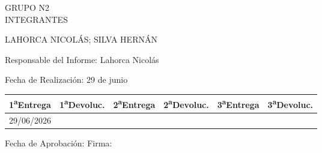 \begin{titlepage}
\begin{minipage}{\textwidth}
    \vspace{4mm}
    GRUPO N\textdegree{}2\\
    INTEGRANTES

    \vspace{2mm}
    LAHORCA NICOLÁS; SILVA HERNÁN

    \vspace{4mm}
    Responsable del Informe: Lahorca Nicolás

    \vspace{4mm}
    Fecha de Realización: 29 de junio

    \vspace{4mm}
    \begin{tabularx}{\textwidth}{|X|X|X|X|X|X|}
        \hline
        1\textsuperscript{a}Entrega  & 
        1\textsuperscript{a}Devoluc. &
        2\textsuperscript{a}Entrega  &
        2\textsuperscript{a}Devoluc. &
        3\textsuperscript{a}Entrega  &
        3\textsuperscript{a}Devoluc. \\
        \hline
        \rule{0pt}{1cm} 29/06/2026 & & & & &  \\
        \hline
    \end{tabularx}

    \vspace{1cm}
    Fecha de Aprobación: \hspace{3cm} Firma:

\end{minipage}

\restoregeometry
\end{titlepage}

